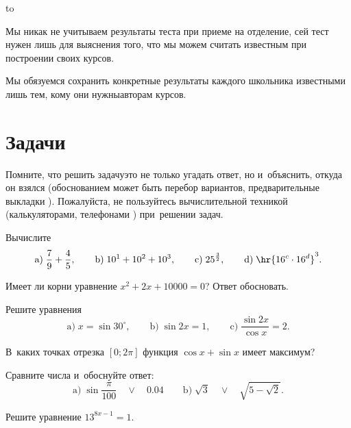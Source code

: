 \documentclass[draft]{article}
\begin{document}
\hbox to \textwidth{\Large Тест <<Семнадцать мгновений весны>>\hfil ФизЛЭШ, 17 апреля 2011~г.}
\medskip

{\small Мы никак не учитываем результаты теста при приеме на отделение, сей
тест нужен лишь для выяснения того, что мы можем считать известным при
построении своих курсов.

Мы обязуемся сохранить конкретные результаты каждого школьника
известными лишь тем, кому они нужны\т авторам курсов.\par}

\section{Задачи}

Помните, что решить задачу\т это не только угадать ответ,
но и~объяснить, откуда он взялся (обоснованием может быть
перебор вариантов, предварительные выкладки ).
Пожалуйста, не пользуйтесь вычислительной техникой (калькуляторами,
телефонами ) при~решении задач.

\def\po#1{\mbox{#1})\;}

\begin{problem}
Вычислите
$$
\po{a}\frac79+\frac45,\qquad
\po{b} 10^1+10^2+10^3,\qquad
\po{c} 25^{\frac32},\qquad
\po{d} \hr{16^c\cdot 16^d}^3.$$
\end{problem}

\begin{problem}
Имеет ли корни уравнение $x^2 + 2x + 10000=0$? Ответ обосновать.
\end{problem}

\begin{problem}
Решите уравнения
$$
\po{a} x=\sin 30^\circ,\qquad
\po{b} \sin 2x =1,\qquad
\po{c} \frac{\sin 2x}{\cos x}=2.$$
\end{problem}

\begin{problem}
В~каких точках отрезка $[0;2\pi]$ функция $\cos x + \sin x$ имеет максимум?
\end{problem}

\begin{problem}
Сравните числа и~обоснуйте ответ:
$$
\po a \sin \frac\pi{100}\quad\vee\quad 0.04\qquad
\po b \sqrt 3\quad\vee\quad \sqrt{5-\sqrt 2}.
$$
\end{problem}

\begin{problem}
Решите уравнение $13^{8x-1} = 1$.
\end{problem}
\end{document}
